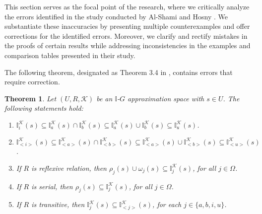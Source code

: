 \documentclass{article}
\theoremstyle{theorem}
\newtheorem{theorem}{Theorem}[section]
\theoremstyle{definition}
\theoremstyle{remark}
\begin{document}
This section serves as the focal point of the research, where we critically analyze the errors identified in the study conducted by Al-Shami and Hosny \cite{Al-shami 2024}. We substantiate these inaccuracies by presenting multiple counterexamples and offer corrections for the identified errors. Moreover, we clarify and rectify mistakes in the proofs of certain results while addressing inconsistencies in the examples and comparison tables presented in their study. \newline

The following theorem, designated as Theorem 3.4 in \cite{Al-shami 2024}, contains errors that require correction.

\begin{theorem}\label{t3} \cite{Al-shami 2024} Let $(U, R, \mathcal{K})$ be an $\mathbb{I}$-$G$ approximation space with $s\in U$. The following statements hold:
\begin{enumerate}
\item  $\mathbb{I}^{\mathcal{K}}_{i}(s) \subseteq \mathbb{I}^{\mathcal{K}}_{a}(s) \cap \mathbb{I}^{\mathcal{K}}_{b}(s) \subseteq \mathbb{I}^{\mathcal{K}}_{a}(s) \cup \mathbb{I}^{\mathcal{K}}_{b}(s) \subseteq \mathbb{I}^{\mathcal{K}}_{u}(s)$.
\item  $\mathbb{I}^{\mathcal{K}}_{<i>}(s) \subseteq \mathbb{I}^{\mathcal{K}}_{<a>}(s) \cap \mathbb{I}^{\mathcal{K}}_{<b>}(s) \subseteq \mathbb{I}^{\mathcal{K}}_{<a>}(s) \cup \mathbb{I}^{\mathcal{K}}_{<b>}(s) \subseteq \mathbb{I}^{\mathcal{K}}_{<u>}(s)$.
\item  If $R$ is reflexive relation, then $\rho_{j}(s) \cup \omega_{j}(s) \subseteq \mathbb{I}^{\mathcal{K}}_{j}(s)$, for all $j \in \Omega$.
\item  If $R$ is serial, then $\rho_{j}(s) \subseteq \mathbb{I}^{\mathcal{K}}_{j}(s)$, for all $j \in \Omega$.
\item  If $R$ is transitive, then $\mathbb{I}^{\mathcal{K}}_{j}(s) \subseteq \mathbb{I}^{\mathcal{K}}_{<j>}(s)$, for each $j \in \{a, b, i, u\}$.
\end{enumerate}
\end{theorem}
\end{document}
